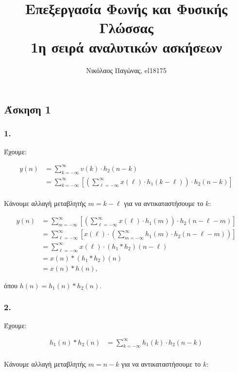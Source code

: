 \documentclass[12pt,a4paper]{article}
\title{Επεξεργασία Φωνής και Φυσικής Γλώσσας \\ 1η σειρά αναλυτικών ασκήσεων}
\author{Νικόλαος Παγώνας, el18175}
\date{}
\begin{document}
	\maketitle	
	
	\subsection*{Άσκηση 1}
		
		\subsubsection*{1.} 
			Έχουμε: 
			
			\begin{align*}
				y(n) &= \sum_{k=-\infty}^{\infty}v(k) \cdot h_2(n-k) \\
				&= \sum_{k=-\infty}^{\infty}\left[\left(\sum_{\ell=-\infty}^{\infty}x(\ell) \cdot h_1(k-\ell)\right) \cdot h_2(n-k)\right] \\
			\end{align*}
		
			Κάνουμε αλλαγή μεταβλητής $m = k - \ell$ για να αντικαταστήσουμε το $k$:
			
			\begin{align*}
				y(n) &= \sum_{m=-\infty}^{\infty}\left[\left(\sum_{\ell=-\infty}^{\infty}x(\ell) \cdot h_1(m)\right) \cdot h_2(n-\ell-m)\right] \\
				&= \sum_{\ell=-\infty}^{\infty}\left[x(\ell) \cdot \left(\sum_{m=-\infty}^{\infty}h_1(m) \cdot h_2(n-\ell-m)\right)\right] \\
				&= \sum_{\ell=-\infty}^{\infty}x(\ell) \cdot \left(h_1 \ast h_2\right)(n-\ell) \\
				&= x(n) \ast (h_1 \ast h_2)(n) \\
				&= x(n) \ast h(n),
			\end{align*}
		
		όπου $h(n) = h_1(n) \ast h_2(n)$.

		\subsubsection*{2.} 
		
			Έχουμε:
			
			\begin{align*}
				h_1(n) \ast h_2(n) &= \sum_{k=-\infty}^{\infty}h_1(k) \cdot h_2(n-k) \\
			\end{align*}
		
			Κάνουμε αλλαγή μεταβλητής $m = n - k$ για να αντικαταστήσουμε το $k$:
			
\end{document}
